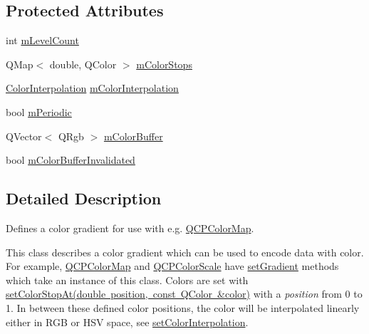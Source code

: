 \subsection*{Protected Attributes}
\begin{DoxyCompactItemize}
\item 
int \mbox{\hyperlink{class_q_c_p_color_gradient_a98fb68e359904b2c991fcae3e38a211a}{m\+Level\+Count}}
\item 
Q\+Map$<$ double, Q\+Color $>$ \mbox{\hyperlink{class_q_c_p_color_gradient_a9e11a2b0974ef289d12c324822bc3a3e}{m\+Color\+Stops}}
\item 
\mbox{\hyperlink{class_q_c_p_color_gradient_ac5dca17cc24336e6ca176610e7f77fc1}{Color\+Interpolation}} \mbox{\hyperlink{class_q_c_p_color_gradient_a028cef73d863800a9ee93ffd641cce01}{m\+Color\+Interpolation}}
\item 
bool \mbox{\hyperlink{class_q_c_p_color_gradient_a4b07deeb20ca1ee2d5ea7e01bf0420af}{m\+Periodic}}
\item 
Q\+Vector$<$ Q\+Rgb $>$ \mbox{\hyperlink{class_q_c_p_color_gradient_af8b5f0739faa5f8295154d47ce38ecff}{m\+Color\+Buffer}}
\item 
bool \mbox{\hyperlink{class_q_c_p_color_gradient_abacf55e11f67d6722a687af1bb2687bd}{m\+Color\+Buffer\+Invalidated}}
\end{DoxyCompactItemize}


\subsection{Detailed Description}
Defines a color gradient for use with e.\+g. \mbox{\hyperlink{class_q_c_p_color_map}{Q\+C\+P\+Color\+Map}}. 

This class describes a color gradient which can be used to encode data with color. For example, \mbox{\hyperlink{class_q_c_p_color_map}{Q\+C\+P\+Color\+Map}} and \mbox{\hyperlink{class_q_c_p_color_scale}{Q\+C\+P\+Color\+Scale}} have \mbox{\hyperlink{class_q_c_p_color_map_a7313c78360471cead3576341a2c50377}{set\+Gradient}} methods which take an instance of this class. Colors are set with \mbox{\hyperlink{class_q_c_p_color_gradient_a3b48be5e78079db1bb2a1188a4c3390e}{set\+Color\+Stop\+At(double position, const Q\+Color \&color)}} with a {\itshape position} from 0 to 1. In between these defined color positions, the color will be interpolated linearly either in R\+GB or H\+SV space, see \mbox{\hyperlink{class_q_c_p_color_gradient_aa13fda86406e1d896a465a409ae63b38}{set\+Color\+Interpolation}}.

